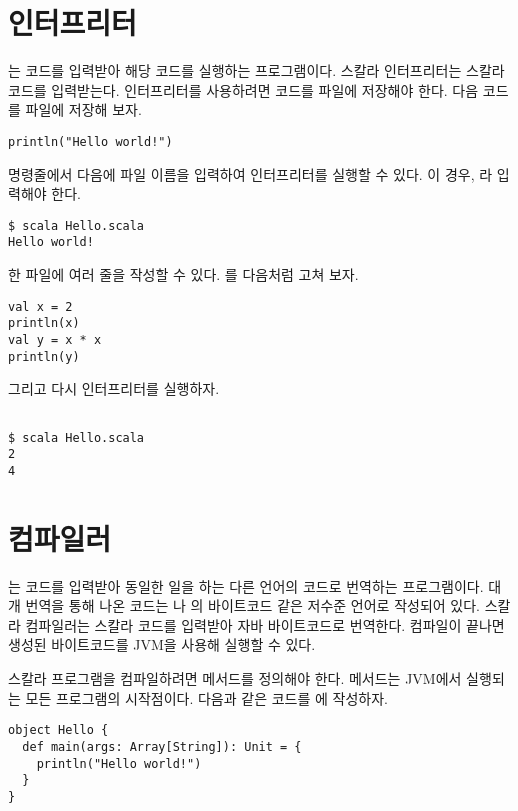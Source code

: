 \section{인터프리터}

는 코드를 입력받아 해당 코드를 실행하는 프로그램이다. 스칼라
인터프리터는 스칼라 코드를 입력받는다. 인터프리터를 사용하려면 코드를 파일에
저장해야 한다. 다음 코드를  파일에 저장해 보자.

\begin{verbatim}
println("Hello world!")
\end{verbatim}

명령줄에서  다음에 파일 이름을 입력하여 인터프리터를 실행할 수 있다. 이
경우, 라 입력해야 한다.

\begin{verbatim}
$ scala Hello.scala
Hello world!
\end{verbatim}

한 파일에 여러 줄을 작성할 수 있다. 를 다음처럼 고쳐 보자.

\begin{verbatim}
val x = 2
println(x)
val y = x * x
println(y)
\end{verbatim}

그리고 다시 인터프리터를 실행하자.
\begin{verbatim}

$ scala Hello.scala
2
4
\end{verbatim}

\section{컴파일러}

는 코드를 입력받아 동일한 일을 하는 다른 언어의 코드로 번역하는
프로그램이다. 대개 번역을 통해 나온 코드는 나
의 바이트코드 같은 저수준 언어로 작성되어 있다. 스칼라
컴파일러는 스칼라 코드를 입력받아 자바 바이트코드로 번역한다. 컴파일이 끝나면
생성된 바이트코드를 JVM을 사용해 실행할 수 있다.

스칼라 프로그램을 컴파일하려면  메서드를 정의해야 한다.  메서드는
JVM에서 실행되는 모든 프로그램의 시작점이다. 다음과 같은 코드를
에 작성하자.

\begin{verbatim}
object Hello {
  def main(args: Array[String]): Unit = {
    println("Hello world!")
  }
}
\end{verbatim}

